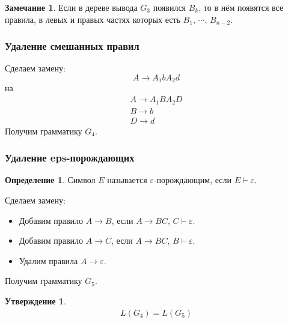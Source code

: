 \documentclass[a4paper,12pt]{article}
\theoremstyle{plain}
\newtheorem{proposition}{Утверждение}[subsection]
\theoremstyle{definition}
\newtheorem{definition}{Определение}[subsection]
\newtheorem*{note}{Замечание}
\theoremstyle{remark}
\begin{document}
\begin{note}
	Если в дереве вывода $G_3$ появился $B_k$, то в нём появятся все правила, в левых и правых частях которых есть $B_1,\,\cdots,\,B_{n-2}$.
\end{note}

\subsubsection*{Удаление смешанных правил}
Сделаем замену:
\[
	A \to A_1bA_2d
\]
на
\begin{align*}
	A \to A_1BA_2D \\
	B \to b        \\
	D \to d
\end{align*}
Получим грамматику $G_4$.

\subsubsection*{Удаление eps-порождающих}
\begin{definition}
	Символ $E$ называется $\varepsilon$-порождающим, если $E \vdash \varepsilon$.
\end{definition}

Сделаем замену:
\begin{itemize}
	\item Добавим правило $A \to B$, если $A \to BC,\, C \vdash \varepsilon$.
	\item Добавим правило $A \to C$, если $A \to BC,\, B \vdash \varepsilon$.
	\item Удалим правила $A \to \varepsilon$.
\end{itemize}
Получим грамматику $G_5$.

\begin{proposition}
	\begin{align*}
		L(G_4) = L(G_5)
	\end{align*}
\end{proposition}
\end{document}
